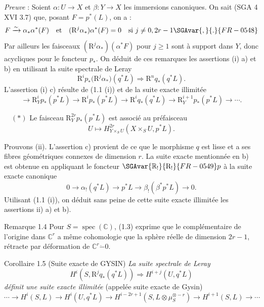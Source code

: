 \emph{Preuve} : Soient $\alpha:U\to X$ et $\beta:Y\to X$ les immersions canoniques. On sait (SGA 4 XVI 3.7) que, posant $F=p^*(L)$, on a :
\[
F\xrightarrow{\sim}\alpha_*\alpha^*(F)
\quad\text{et}\quad
(\mathrm{R}^j\alpha_*)\alpha^*(F)=0\quad\text{si }j\ne0,2r-1\SGAvar{,}{.}{FR-0548}
\]
Par ailleurs les faisceaux $(\mathrm{R}^j\alpha_*)(\alpha^*F)$ pour $j\ge1$ sont à support dans $Y$, donc acycliques pour le foncteur $p_*$. On déduit de ces remarques les assertions (i) a) et b) en utilisant la suite spectrale de Leray
\[
\mathrm{R}^i p_*\bigl(\mathrm{R}^j\alpha_*\bigr)(q^*L)\Longrightarrow \mathrm{R}^n q_*(q^*L).
\]
L'assertion (i) c) résulte de (1.1 (i)) et de la suite exacte illimitée
\[
\longrightarrow \mathrm{R}_Y^i p_*(p^*L)\longrightarrow \mathrm{R}^i p_*(p^*L)\longrightarrow \mathrm{R}^i q_*(q^*L)
\longrightarrow \mathrm{R}_Y^{i+1}p_*(p^*L)\longrightarrow\cdots.
\]

\(\quad (*)\) Le faisceau $\mathrm{R}_Y^{2r}p_*(p^*L)$ est associé au préfaisceau
\[
U\longmapsto H^{2r}_{Y\times_S U}(X\times_S U,p^*L).
\]

Prouvons (ii). L'assertion c) provient de ce que le morphisme $q$ est lisse et a ses fibres géométriques connexes de dimension $r$. La suite exacte mentionnée en b) est obtenue en appliquant le foncteur $\SGAvar{\mathbb{R}_!}{\mathrm{R}_!}{FR-0549}p$ à la suite exacte canonique
\[
0\longrightarrow \alpha_!(q^*L)\longrightarrow p^*L\longrightarrow \beta_!(\beta^*p^*L)\longrightarrow 0.
\]
Utilisant (1.1 (i)), on déduit sans peine de cette suite exacte illimitée les assertions ii) a) et b).

\begin{statement}{Remarque 1.4}
Pour $S=\operatorname{spec}(\mathbb{C})$, (1.3) exprime que le complémentaire de l'origine dans $\mathbb{C}^r$ a même cohomologie que la sphère réelle de dimension $2r-1$, rétracte par déformation de $\mathbb{C}^r\mathbin{\dot{-}}0$.
\end{statement}

\begin{statement}{Corollaire 1.5 (Suite exacte de GYSIN)}
\emph{La suite spectrale de Leray}
\[
H^i(S,\mathrm{R}^j q_*(q^*L))\Rightarrow H^{i+j}(U,q^*L)
\]
\emph{définit une suite exacte illimitée} (appelée suite exacte de Gysin)
\[
\cdots\longrightarrow H^i(S,L)\longrightarrow H^i(U,q^*L)\longrightarrow
H^{i-2r+1}(S,L\otimes\mu_S^{\otimes -r})\longrightarrow H^{i+1}(S,L)\longrightarrow\cdots
\]
\end{statement}

